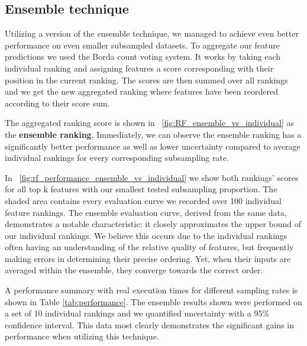 \documentclass[fleqn,moreauthors,10pt]{ds_report}
\begin{document}
\subsection*{Ensemble technique}

Utilizing a version of the ensemble technique, we managed to achieve even better performance on even smaller subsampled datasets. To aggregate our feature predictions we used the Borda count voting system. It works by taking each individual ranking and assigning features a score corresponding with their position in the current ranking. The scores are then summed over all rankings and we get the new aggregated ranking where features have been reordered according to their score sum. 

The aggregated ranking score is shown in \figurename~\ref{fig:RF_ensemble_vs_individual} as the \textbf{ensemble ranking}. Immediately, we can observe the ensemble ranking has a significantly better performance as well as lower uncertainty compared to average individual rankings for every corresponding subsampling rate.

In \figurename~\ref{fig:rf_performance_ensemble_vs_individual} we show both rankings' scores for all top k features with our smallest tested subsampling proportion. The shaded area contains every evaluation curve we recorded over 100 individual feature rankings. The ensemble evaluation curve, derived from the same data, demonstrates a notable characteristic: it closely approximates the upper bound of our individual rankings. We believe this occurs due to the individual rankings often having an understanding of the relative quality of features, but frequently making errors in determining their precise ordering. Yet, when their inputs are averaged within the ensemble, they converge towards the correct order.

A performance summary with real execution times for different sampling rates is shown in Table \ref{tab:performance}. The ensemble results shown were performed on a set of 10 individual rankings and we quantified uncertainty with a 95\% confidence interval. This data most clearly demonstrates the significant gains in performance when utilizing this technique.


\end{document}

